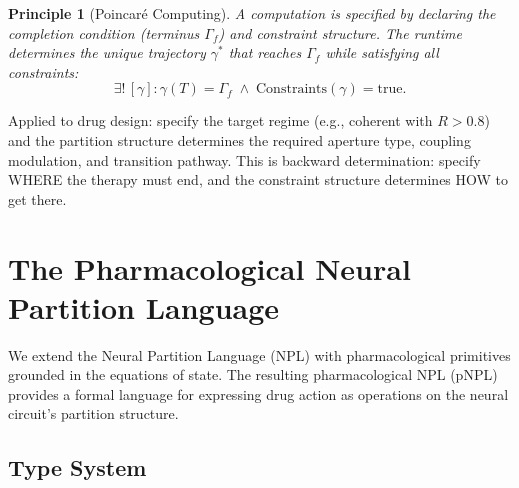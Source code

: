 \documentclass[twocolumn,10pt]{article}
\newtheorem{principle}[theorem]{Principle}
\theoremstyle{remark}
\newcommand{\Rorder}{R}
\newcommand{\Gstate}{\Gamma}
\begin{document}
\begin{principle}[Poincar\'e Computing]
\label{princ:poincare}
A computation is specified by declaring the completion condition (terminus $\Gstate_f$) and constraint structure. The runtime determines the unique trajectory $\gamma^*$ that reaches $\Gstate_f$ while satisfying all constraints:
\begin{equation}
  \exists!\,[\gamma] : \gamma(T) = \Gstate_f \;\wedge\; \mathrm{Constraints}(\gamma) = \mathrm{true}.
\end{equation}
\end{principle}

Applied to drug design: specify the target regime (e.g., coherent with $\Rorder > 0.8$) and the partition structure determines the required aperture type, coupling modulation, and transition pathway. This is backward determination: specify WHERE the therapy must end, and the constraint structure determines HOW to get there.

\section{The Pharmacological Neural Partition Language}
\label{sec:pnpl}

We extend the Neural Partition Language (NPL) with pharmacological primitives grounded in the equations of state. The resulting pharmacological NPL (pNPL) provides a formal language for expressing drug action as operations on the neural circuit's partition structure.

\subsection{Type System}
\end{document}
